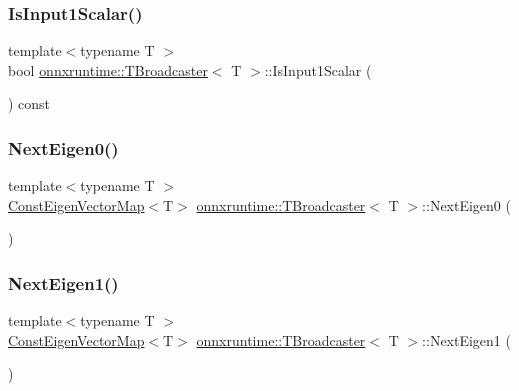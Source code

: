 \subsubsection{\texorpdfstring{Is\+Input1\+Scalar()}{IsInput1Scalar()}}
{\footnotesize\ttfamily template$<$typename T $>$ \\
bool \mbox{\hyperlink{structonnxruntime_1_1TBroadcaster}{onnxruntime\+::\+T\+Broadcaster}}$<$ T $>$\+::Is\+Input1\+Scalar (\begin{DoxyParamCaption}{ }\end{DoxyParamCaption}) const\hspace{0.3cm}{\ttfamily [inline]}}

\mbox{\label{structonnxruntime_1_1TBroadcaster_af19e6199bad783d2c6b3b40b09f7e8df}} 
\subsubsection{\texorpdfstring{Next\+Eigen0()}{NextEigen0()}}
{\footnotesize\ttfamily template$<$typename T $>$ \\
\mbox{\hyperlink{namespaceonnxruntime_a16eca66228ee3a40fe3ae89db53e08ee}{Const\+Eigen\+Vector\+Map}}$<$T$>$ \mbox{\hyperlink{structonnxruntime_1_1TBroadcaster}{onnxruntime\+::\+T\+Broadcaster}}$<$ T $>$\+::Next\+Eigen0 (\begin{DoxyParamCaption}{ }\end{DoxyParamCaption})\hspace{0.3cm}{\ttfamily [inline]}}

\mbox{\label{structonnxruntime_1_1TBroadcaster_aca09cafcab37af122fc0726534c71590}} 
\subsubsection{\texorpdfstring{Next\+Eigen1()}{NextEigen1()}}
{\footnotesize\ttfamily template$<$typename T $>$ \\
\mbox{\hyperlink{namespaceonnxruntime_a16eca66228ee3a40fe3ae89db53e08ee}{Const\+Eigen\+Vector\+Map}}$<$T$>$ \mbox{\hyperlink{structonnxruntime_1_1TBroadcaster}{onnxruntime\+::\+T\+Broadcaster}}$<$ T $>$\+::Next\+Eigen1 (\begin{DoxyParamCaption}{ }\end{DoxyParamCaption})\hspace{0.3cm}{\ttfamily [inline]}}

